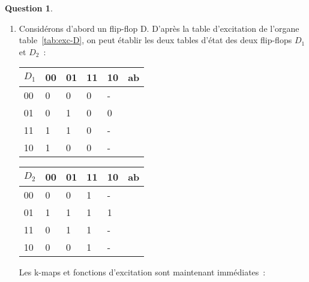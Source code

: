 \documentclass[11pt,a4paper]{article}
\theoremstyle{definition}%
\newtheorem{Q}{Question}[] %
\begin{document}
\begin{Q}
{		\begin{enumerate}
			\item Considérons d'abord un flip-flop D.
			D'après la table d'excitation de l'organe table~\ref{tab:exc-D}, on peut établir les deux tables d'état des deux flip-flops $D_1$ et $D_2$~:
			\begin{center}
				\begin{tabular}{|l|l|l|l|l|l} \hline
				$D_1$ & 00         & 01         & 11         & 10         & \multicolumn{1}{l|}{ab} \\ \hline
				00           & 0 & 0 & 0 & - & \\ \cline{1-5}
				01           & 0 & 1 & 0 & 0 & \\ \cline{1-5}
				11           & 1 & 1 & 0 & - & \\ \cline{1-5}
				10           & 1 & 0 & 0 & - & \\ \cline{1-5}
				\end{tabular}
				\begin{tabular}{|l|l|l|l|l|l} \hline
				$D_2$ & 00         & 01         & 11         & 10         & \multicolumn{1}{l|}{ab} \\ \hline
				00           & 0 & 0 & 1 & - & \\ \cline{1-5}
				01           & 1 & 1 & 1 & 1 & \\ \cline{1-5}
				11           & 0 & 1 & 1 & - & \\ \cline{1-5}
				10           & 0 & 0 & 1 & - & \\ \cline{1-5}
				\end{tabular}
			\end{center}

			Les k-maps et fonctions d'excitation sont maintenant immédiates~:
			\begin{center}

			\end{center}



\end{enumerate}}
\end{Q}
\end{document}
